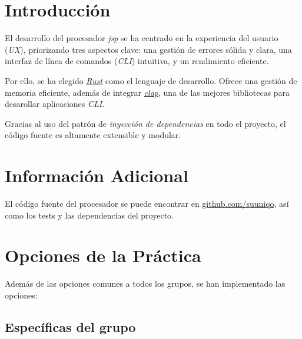 \documentclass[a4paper]{CSMakotoTechnicalReport}
\begin{document}
\begin{multicols}{2} %


    \tableofcontents


    \section{Introducción}

    El desarrollo del procesador \textit{jsp} se ha centrado en la experiencia del usuario (\textit{UX}), priorizando tres aspectos clave: una gestión de errores sólida y clara, una interfaz de línea de comandos (\textit{CLI}) intuitiva, y un rendimiento eficiente.

    Por ello, se ha elegido \href{https://rust-lang.org/}{\textit{Rust}} como el lenguaje de desarrollo. Ofrece una gestión de memoria eficiente, además de integrar \href{https://docs.rs/clap/latest/clap/}{\textit{clap}}, una de las mejores bibliotecas para desarollar aplicaciones \textit{CLI}.

    Gracias al uso del patrón de \textit{inyección de dependencias} en todo el proyecto, el código fuente es altamente extensible y modular.

    \section{Información Adicional}

    El código fuente del procesador se puede encontrar en \href{https://www.github.com/suuniqo}{github.com/suuniqo}, así como los tests y las dependencias del proyecto.

    \section{Opciones de la Práctica}

    Además de las opciones comunes a todos los grupos, se han implementado las opciones:

    \subsection{Específicas del grupo}


\end{multicols}
\end{document}
